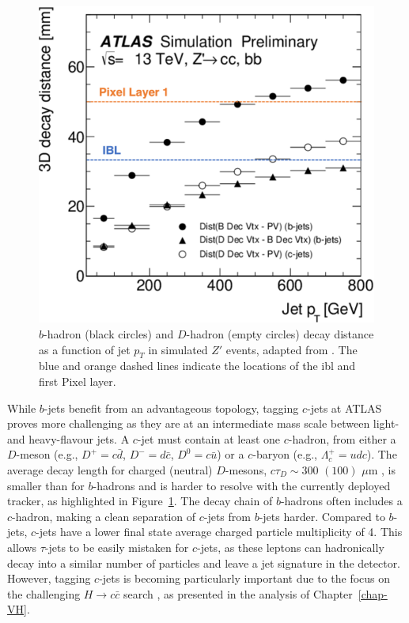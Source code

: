 \begin{figure}[h!]
\begin{minipage}{0.48\textwidth}
  \includegraphics[width=\textwidth]{Images/FTAG/intro/bhaddecay2ada.png}
  \caption{$b$-hadron (black circles) and $D$-hadron (empty circles) decay distance as a function of jet $p_T$ in simulated $Z'$ events, adapted from \cite{ATL-PHYS-PUB-2018-025}. The blue and orange dashed lines indicate the locations of the \gls{ibl} and first Pixel layer.} 
  \label{fig:bhaddecay}
\end{minipage}
\end{figure}

While $b$-jets benefit from an advantageous topology, tagging $c$-jets at ATLAS proves more challenging as they are at an intermediate mass scale between light- and heavy-flavour jets. A $c$-jet must contain at least one $c$-hadron, from either a $D$-meson (e.g., $D^+=c\bar{d}$, $D^-=d\bar{c}$, $D^0=c\bar{u}$) or a $c$-baryon (e.g., $\Lambda_c^+=udc$). The average decay length for charged (neutral) $D$-mesons, $c\tau_D \sim 300$ $(100)$ $\mu$m \cite{Tanabashi:2018oca}, is smaller than for $b$-hadrons and is harder to resolve with the currently deployed tracker, as highlighted in Figure~\ref{fig:bhaddecay}. The decay chain of $b$-hadrons often includes a $c$-hadron, making a clean separation of $c$-jets from $b$-jets harder. Compared to $b$-jets, $c$-jets have a lower final state average charged particle multiplicity of 4. This allows $\tau$-jets to be easily mistaken for $c$-jets, as these leptons can hadronically decay into a similar number of particles and leave a jet signature in the detector. However, tagging $c$-jets is becoming particularly important due to the focus on the challenging $H \rightarrow c\bar{c}$ search \cite{Aaboud:2018fhh, Collaboration:2721696, arXiv:2205.05550}, as presented in the analysis of Chapter~\ref{chap-VH}. 

